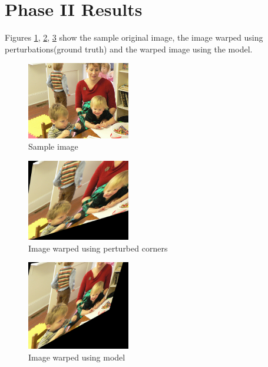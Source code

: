\documentclass[conference]{IEEEtran}
\begin{document}
\section{Phase II Results}

Figures \ref{fig: sample image for dl}, \ref{fig: warped image}, \ref{fig: model warped image} show the sample original image, the image warped using perturbations(ground truth) and the warped image using the model.

\begin{figure}[!htbp]
  \centering
  \includegraphics[width=0.4\textwidth]{phase1/original.png}
  \caption{Sample image}
  \label{fig: sample image for dl}
\end{figure}

\begin{figure}[!htbp]
  \centering
  \includegraphics[width=0.4\textwidth]{phase1/original_warp.png}
  \caption{Image warped using perturbed corners}
  \label{fig: warped image}
\end{figure}

\begin{figure}[!htbp]
  \centering
  \includegraphics[width=0.4\textwidth]{phase1/model_warped.png}
  \caption{Image warped using model}
  \label{fig: model warped image}
\end{figure}
\end{document}
